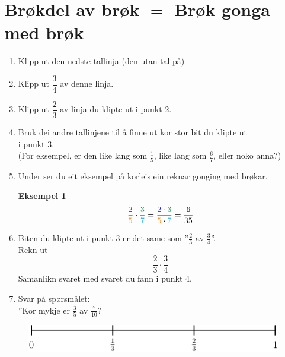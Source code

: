 




\large
\section*{Brøkdel av brøk $ \bm= $ Brøk gonga med brøk}
\vspace{20pt}
\begin{minipage}{12.5cm}
\begin{enumerate}
	\item Klipp ut den nedste tallinja (den utan tal på)
	\item Klipp ut $ \dfrac{3}{4} $ av denne linja.
	\item Klipp ut $ \dfrac{2}{3} $ av linja du klipte ut i punkt 2.
	\item Bruk dei andre tallinjene til å finne ut kor stor bit du klipte ut\\ i punkt 3.\\
	{\small (For eksempel, er den like lang som $ \frac{1}{5} $, like lang som $ \frac{6}{7} $, eller noko anna?)}
	\item Under ser du eit eksempel på korleis ein reknar gonging med brøkar.\\[-12pt]
	\begin{tcolorbox}[boxrule=0.3 mm,arc=0mm,enhanced jigsaw,breakable,colback=green!3]
		{\textbf{Eksempel 1} \vspace{5 pt}\\}   \vspace{-16pt}
		\begin{align*}
			\frac{\ca{2}}{\cb{5}}\cdot\frac{\cc{3}}{\cd{7}}=\frac{\ca{2}\cdot \cc{3}}{\cb{5}\cdot\cd{7}}=\frac{6}{35}
		\end{align*}	
	\end{tcolorbox} 
\item Biten du klipte ut i punkt 3 er det same som ''$ \frac{2}{3}\text{ av } \frac{3}{4} $''. \\Rekn ut 
\[ \frac{2}{3}\cdot \frac{3}{4} \]
Samanlikn svaret med svaret du fann i punkt 4.
\item Svar på spørsmålet:\\[5pt]
''Kor mykje er $ \frac{3}{5} $ av $ \frac{7}{10} ?$
\end{enumerate}
	\end{minipage}
\newpage
\phantom{a}\vfill

\begin{figure}
	\centering
	\includegraphics[]{3del}
\end{figure}\vspace{40pt}


